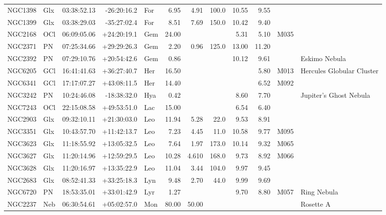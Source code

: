 \documentclass[11pt]{article}
\begin{document}
\begin{longtable}{llrrlrrrrrrl}
  NGC1398 & Glx     & 03:38:52.13 & -26:20:16.2 & For & 6.95   & 4.91   & 100.0 & 10.55 & 9.55   &      & \\
  NGC1399 & Glx     & 03:38:29.03 & -35:27:02.4 & For & 8.51   & 7.69   & 150.0 & 10.42 & 9.40   &      & \\
  NGC2168 & OCl     & 06:09:05.06 & +24:20:19.1 & Gem & 24.00  &        &       & 5.31  & 5.10   & M035 & \\
  NGC2371 & PN      & 07:25:34.66 & +29:29:26.3 & Gem & 2.20   & 0.96   & 125.0 & 13.00 & 11.20  &      & \\
  NGC2392 & PN      & 07:29:10.76 & +20:54:42.6 & Gem & 0.86   &        &       & 10.12 & 9.61   &      & Eskimo Nebula \\
  NGC6205 & GCl     & 16:41:41.63 & +36:27:40.7 & Her & 16.50  &        &       &       & 5.80   & M013 & Hercules Globular Cluster \\
  NGC6341 & GCl     & 17:17:07.27 & +43:08:11.5 & Her & 14.40  &        &       &       & 6.52   & M092 & \\
  NGC3242 & PN      & 10:24:46.08 & -18:38:32.0 & Hya & 0.42   &        &       & 8.60  & 7.70   &      & Jupiter's Ghost Nebula \\
  NGC7243 & OCl     & 22:15:08.58 & +49:53:51.0 & Lac & 15.00  &        &       & 6.54  & 6.40   &      & \\
  NGC2903 & Glx     & 09:32:10.11 & +21:30:03.0 & Leo & 11.94  & 5.28   & 22.0  & 9.53  & 8.91   &      & \\
  NGC3351 & Glx     & 10:43:57.70 & +11:42:13.7 & Leo & 7.23   & 4.45   & 11.0  & 10.58 & 9.77   & M095 & \\
  NGC3623 & Glx     & 11:18:55.92 & +13:05:32.5 & Leo & 7.64   & 1.97   & 173.0 & 10.14 & 9.32   & M065 & \\
  NGC3627 & Glx     & 11:20:14.96 & +12:59:29.5 & Leo & 10.28 & 4.610   & 168.0 & 9.73  & 8.92   & M066 & \\
  NGC3628 & Glx     & 11:20:16.97 & +13:35:22.9 & Leo & 11.04  & 3.44   & 104.0 & 9.97  & 9.45   &      & \\
  NGC2683 & Glx     & 08:52:41.33 & +33:25:18.3 & Lyn & 9.48   & 2.70   & 44.0  & 9.99  & 9.69   &      & \\
  NGC6720 & PN      & 18:53:35.01 & +33:01:42.9 & Lyr & 1.27   &        &       & 9.70  & 8.80   & M057 & Ring Nebula \\
  NGC2237 & Neb     & 06:30:54.61 & +05:02:57.0 & Mon & 80.00  & 50.00  &       &       &        &      & Rosette A \\

\end{longtable}
\end{document}

